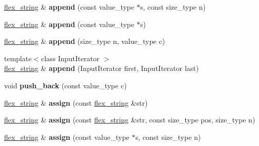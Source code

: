 \begin{DoxyCompactItemize}
\item 
\hypertarget{classflex__string_a4eaeb072cc00991e8f1c81543b65e4b6}{}\hyperlink{classflex__string}{flex\+\_\+string} \& {\bfseries append} (const value\+\_\+type $\ast$s, const size\+\_\+type n)\label{classflex__string_a4eaeb072cc00991e8f1c81543b65e4b6}

\item 
\hypertarget{classflex__string_ae73673d04e1cadba07341f4d13baec29}{}\hyperlink{classflex__string}{flex\+\_\+string} \& {\bfseries append} (const value\+\_\+type $\ast$s)\label{classflex__string_ae73673d04e1cadba07341f4d13baec29}

\item 
\hypertarget{classflex__string_aa6d7f525edc191c58440b36a87de8ab7}{}\hyperlink{classflex__string}{flex\+\_\+string} \& {\bfseries append} (size\+\_\+type n, value\+\_\+type c)\label{classflex__string_aa6d7f525edc191c58440b36a87de8ab7}

\item 
\hypertarget{classflex__string_a23bf38b8c1000d800de23fbb8f5beb6b}{}{\footnotesize template$<$class Input\+Iterator $>$ }\\\hyperlink{classflex__string}{flex\+\_\+string} \& {\bfseries append} (Input\+Iterator first, Input\+Iterator last)\label{classflex__string_a23bf38b8c1000d800de23fbb8f5beb6b}

\item 
\hypertarget{classflex__string_a801448bd91d762765f2b7e6d6872f612}{}void {\bfseries push\+\_\+back} (const value\+\_\+type c)\label{classflex__string_a801448bd91d762765f2b7e6d6872f612}

\item 
\hypertarget{classflex__string_a6de7772aeb80c07932e840b49902d67f}{}\hyperlink{classflex__string}{flex\+\_\+string} \& {\bfseries assign} (const \hyperlink{classflex__string}{flex\+\_\+string} \&str)\label{classflex__string_a6de7772aeb80c07932e840b49902d67f}

\item 
\hypertarget{classflex__string_adef1c9e27e25c731a2c96725b823a355}{}\hyperlink{classflex__string}{flex\+\_\+string} \& {\bfseries assign} (const \hyperlink{classflex__string}{flex\+\_\+string} \&str, const size\+\_\+type pos, size\+\_\+type n)\label{classflex__string_adef1c9e27e25c731a2c96725b823a355}

\item 
\hypertarget{classflex__string_a3893570569871084a8f3e2056b8be555}{}\hyperlink{classflex__string}{flex\+\_\+string} \& {\bfseries assign} (const value\+\_\+type $\ast$s, const size\+\_\+type n)\label{classflex__string_a3893570569871084a8f3e2056b8be555}


\end{DoxyCompactItemize}

